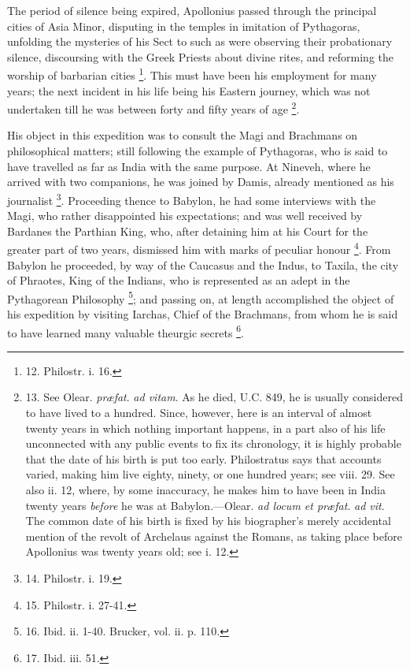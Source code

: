The period of silence being
expired, Apollonius passed through the principal cities of Asia Minor,
disputing in the temples in imitation of Pythagoras, unfolding the
mysteries of his Sect to such as were observing their probationary
silence, discoursing with the Greek Priests about divine rites, and
reforming the worship of barbarian cities \footnote{12.
Philostr. i. 16.}. This must have been his employment for many years; the next
incident in his life being his Eastern journey, which was not
undertaken till he was between forty and fifty years of age \footnote{13.
See Olear. \emph{præfat}. \emph{ad vitam}. As he died, U.C. 849, he is usually considered to have
lived to a hundred. Since, however, here is an interval of almost
twenty years in which nothing important happens, in a part also of his
life unconnected with any public events to fix its chronology, it is
highly probable that the date of his birth is put too early.
Philostratus says that accounts varied, making him live eighty,
ninety, or one hundred years; see viii. 29. See also ii. 12, where, by
some inaccuracy, he makes him to have been in India twenty years \emph{before}
he was at Babylon.—Olear. \emph{ad locum et præfat}. \emph{ad vit}.
The common date of his birth is fixed by his biographer's merely
accidental mention of the revolt of Archelaus against the Romans, as
taking place before Apollonius was twenty years old; see i. 12.}.

His object in this expedition
was to consult the Magi and Brachmans on philosophical matters; still
following the example of Pythagoras, who is said to have travelled as
far as India with the same purpose. At Nineveh, where he arrived with
two companions, he was joined by Damis, already mentioned as his
journalist \footnote{14.
Philostr. i. 19.}. Proceeding
thence to Babylon, he had some interviews with the Magi, who rather
disappointed his expectations; and was well received by Bardanes the
Parthian King, who, after detaining him at his Court for the greater
part of two years, dismissed him with marks of peculiar honour \footnote{15.
Philostr. i. 27-41.}. From Babylon
he proceeded, by way of the Caucasus and the Indus, to Taxila, the
city of Phraotes, King of the Indians, who is represented as an adept
in the Pythagorean Philosophy \footnote{16.
Ibid. ii. 1-40. Brucker, vol. ii. p. 110.}; and passing on, at length accomplished the object of his
expedition by visiting Iarchas, Chief of the Brachmans, from whom he
is said to have learned many valuable theurgic secrets \footnote{17.
Ibid. iii. 51.}.

